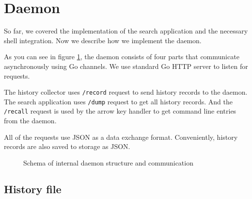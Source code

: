 \section{Daemon}

So far, we covered the implementation of the search application and the necessary shell integration. Now we describe how we implement the daemon.


As you can see in figure \ref{impl-daemon-channels}, the daemon consists of four parts that communicate asynchronously using Go channels\cite{lib-go-channels}. We use standard Go HTTP server\cite{lib-go-http} to listen for requests. 

The history collector uses \verb|/record| request to send history records to the daemon. The search application uses \verb|/dump| request to get all history records. And the \verb|/recall| request is used by the arrow key handler to get command line entries from the daemon. 

All of the requests use JSON as a data exchange format. Conveniently, history records are also saved to storage as JSON.

\begin{figure}
\centering
{}
\caption{Schema of internal daemon structure and communication}
\label{impl-daemon-channels}
\end{figure}

\subsection{History file}

